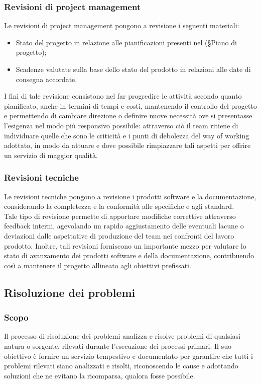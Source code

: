 \documentclass[10pt, a4paper]{article}
\begin{document}
\subsubsection{Revisioni di project management}
Le revisioni di project management pongono a revisione i seguenti materiali:
\begin{itemize}
    \item Stato del progetto in relazione alle pianificazioni presenti nel (\S Piano di progetto);
    \item Scadenze valutate sulla base dello stato del prodotto in relazioni alle date di consegna accordate.
\end{itemize}
I fini di tale revisione consistono nel far progredire le attività secondo quanto pianificato, anche in termini di tempi e costi, mantenendo il controllo del progetto e 
permettendo di cambiare direzione o definire nuove necessità ove si presentasse l'esigenza nel modo più responsivo possibile: attraverso ciò il team
ritiene di individuare quelle che sono le criticità e i punti di debolezza del way of working adottato, in modo da attuare e dove possibile rimpiazzare
tali aspetti per offrire un servizio di maggior qualità.

\subsubsection{Revisioni tecniche}
Le revisioni tecniche pongono a revisione i prodotti software e la documentazione, considerando la completezza e la conformità alle specifiche e agli standard.\\
Tale tipo di revisione permette di apportare modifiche correttive attraverso feedback interni, agevolando un rapido aggiustamento delle eventuali lacune o deviazioni
dalle aspettative di produzione del team nei confronti del lavoro prodotto. Inoltre, tali revisioni forniscono un importante 
mezzo per valutare lo stato di avanzamento dei prodotti software e della documentazione, contribuendo così a mantenere il progetto allineato agli obiettivi 
prefissati.

\subsection{Risoluzione dei problemi}
\subsubsection{Scopo}
Il processo di risoluzione dei problemi analizza e risolve problemi di qualsiasi natura o sorgente, rilevati durante l'esecuzione dei processi primari.
Il suo obiettivo è fornire un servizio tempestivo e documentato per garantire che tutti i problemi rilevati siano analizzati e risolti, riconoscendo le cause e adottando soluzioni che ne evitano la ricomparsa, qualora fosse possibile.
\end{document}
